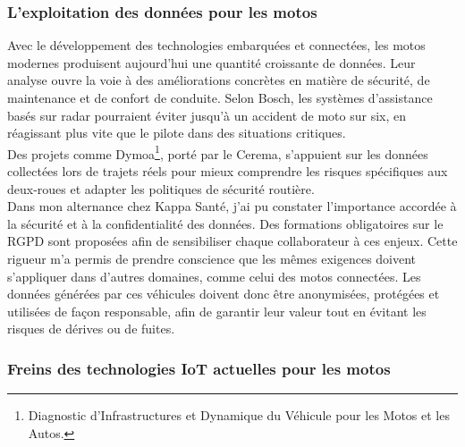 \subsubsection{L'exploitation des données pour les motos}
Avec le développement des technologies embarquées et connectées, les motos modernes produisent aujourd’hui une quantité croissante de données. Leur analyse ouvre la voie à des améliorations concrètes en matière de sécurité, de maintenance et de confort de conduite. Selon Bosch\cite{aras_bosh_site_off}, les systèmes d’assistance basés sur radar pourraient éviter jusqu’à un accident de moto sur six, en réagissant plus vite que le pilote dans des situations critiques.\\
Des projets comme Dymoa\footnote{Diagnostic d’Infrastructures et Dynamique du Véhicule pour les Motos et les Autos.}, porté par le Cerema, s’appuient sur les données collectées lors de trajets réels pour mieux comprendre les risques spécifiques aux deux-roues et adapter les politiques de sécurité routière.\\
Dans mon alternance chez Kappa Santé, j’ai pu constater l’importance accordée à la sécurité et à la confidentialité des données. Des formations obligatoires sur le RGPD sont proposées afin de sensibiliser chaque collaborateur à ces enjeux. Cette rigueur m’a permis de prendre conscience que les mêmes exigences doivent s’appliquer dans d’autres domaines, comme celui des motos connectées. Les données générées par ces véhicules doivent donc être anonymisées, protégées et utilisées de façon responsable, afin de garantir leur valeur tout en évitant les risques de dérives ou de fuites.

\subsubsection{Freins des technologies IoT actuelles pour les motos}

